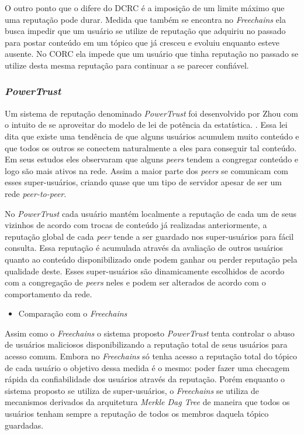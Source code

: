 \documentclass[12pt]{article}
\newcommand{\FC} {\textit{Freechains}\xspace}
\newcommand{\PtoP} {\textit{peer-to-peer}\xspace}
\begin{document}
O outro ponto que o difere do DCRC é a imposição de um limite máximo que uma reputação pode durar.
Medida que também se encontra no \FC ela busca impedir que um usuário se utilize de reputação que adquiriu no passado para postar conteúdo em um tópico que já cresceu e evoluiu enquanto esteve ausente.
No CORC ela impede que um usuário que tinha reputação no passado se utilize desta mesma reputação para continuar a se parecer confiável. 

\subsubsection{\textit{PowerTrust}} \label{subsub:powertrust}

Um sistema de reputação denominado \textit{PowerTrust} foi desenvolvido por Zhou com o intuito de se aproveitar do modelo de lei de potência da estatística. \cite{zhou2007powertrust}.
Essa lei dita que existe uma tendência de que alguns usuários acumulem muito conteúdo e que todos os outros se conectem naturalmente a eles para conseguir tal conteúdo.
Em seus estudos eles observaram que alguns \textit{peers} tendem a congregar conteúdo e logo são mais ativos na rede.
Assim a maior parte dos \textit{peers} se comunicam com esses super-usuários, criando quase que um tipo de servidor apesar de ser um rede \PtoP.

No \textit{PowerTrust} cada usuário mantém localmente a reputação de cada um de seus vizinhos de acordo com trocas de conteúdo já realizadas anteriormente, a reputação global de cada \textit{peer} tende a ser guardado nos super-usuários para fácil consulta.
Essa reputação é acumulada através da avaliação de outros usuários quanto ao conteúdo disponibilizado onde podem ganhar ou perder reputação pela qualidade deste.
Esses super-usuários são dinamicamente escolhidos de acordo com a congregação de \textit{peers} neles e podem ser alterados de acordo com o comportamento da rede.

\begin{itemize}
    \item Comparação com o \FC
\end{itemize}

Assim como o \FC o sistema proposto \textit{PowerTrust} tenta controlar o abuso de usuários maliciosos disponibilizando a reputação total de seus usuários para acesso comum.
Embora no \FC só tenha acesso a reputação total do tópico de cada usuário o objetivo dessa medida é o mesmo: poder fazer uma checagem rápida da confiabilidade dos usuários através da reputação.
Porém enquanto o sistema proposto se utiliza de super-usuários, o \FC se utiliza de mecanismos derivados da arquitetura \textit{Merkle Dag Tree} de maneira que todos os usuários tenham sempre a reputação de todos os membros daquela tópico guardadas.
\end{document}

